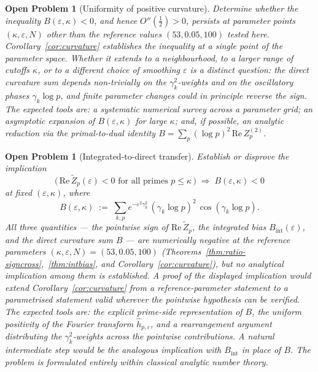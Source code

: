 \documentclass[11pt]{article}
\newtheorem{openproblem}[theorem]{Open Problem}
\newcommand{\Zt}{\widetilde{Z}}
\begin{document}
\begin{openproblem}[Uniformity of positive curvature]\label{op:uniform}
\label{op:uniformity}
Determine whether the inequality $B(\varepsilon,\kappa)<0$, and hence
$O''(\tfrac12)>0$, persists at parameter points
$(\kappa,\varepsilon,N)$ other than the reference values
$(53,0.05,100)$ tested here.
Corollary~\ref{cor:curvature} establishes the inequality at a single
point of the parameter space.
Whether it extends to a neighbourhood, to a larger range of cutoffs
$\kappa$, or to a different choice of smoothing $\varepsilon$ is a
distinct question: the direct curvature sum depends non-trivially on
the $\gamma_k^2$-weights and on the oscillatory phases $\gamma_k\log p$,
and finite parameter changes could in principle reverse the sign.
The expected tools are: a systematic numerical survey across a
parameter grid; an asymptotic expansion of $B(\varepsilon,\kappa)$ for
large $\kappa$; and, if possible, an analytic reduction via the
primal-to-dual identity $B=\sum_p(\log p)^2\,\mathrm{Re}\,Z_p^{(2)}$.
\end{openproblem}

\begin{openproblem}[Integrated-to-direct transfer]\label{op:transfer}
\label{op:transfer}
Establish or disprove the implication
\[
\bigl(\,\mathrm{Re}\,\Zt_p(\varepsilon)<0 \text{ for all primes }
p\le\kappa\,\bigr)
\;\Longrightarrow\;
B(\varepsilon,\kappa)<0
\]
at fixed $(\varepsilon,\kappa)$, where
\[
B(\varepsilon,\kappa) \;:=\; \sum_{k,p} e^{-\varepsilon^2\gamma_k^2}\,
(\gamma_k\log p)^2\,\cos(\gamma_k\log p).
\]
All three quantities --- the pointwise sign of
$\mathrm{Re}\,\Zt_p$, the integrated bias $B_{\mathrm{int}}(\varepsilon)$,
and the direct curvature sum $B$ --- are numerically negative at the
reference parameters $(\kappa,\varepsilon,N)=(53,0.05,100)$
(Theorems~\ref{thm:ratio-signcross},~\ref{thm:intbias}, and
Corollary~\ref{cor:curvature}), but no analytical implication among
them is established.
A proof of the displayed implication would extend
Corollary~\ref{cor:curvature} from a reference-parameter statement to
a parametrised statement valid wherever the pointwise hypothesis can
be verified.
The expected tools are: the explicit prime-side representation of $B$,
the uniform positivity of the Fourier transform
$\widehat{h}_{p,\varepsilon}$, and a rearrangement argument
distributing the $\gamma_k^2$-weights across the pointwise
contributions.
A natural intermediate step would be the analogous implication with
$B_{\mathrm{int}}$ in place of $B$.
The problem is formulated entirely within classical analytic number theory.
\end{openproblem}
\end{document}
